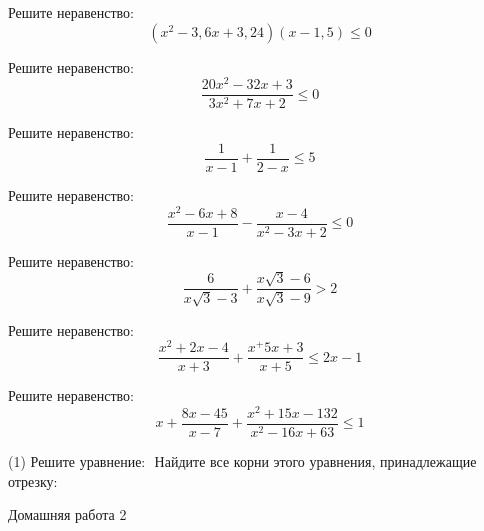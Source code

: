 \begin{class}[number=3]
\begin{listofex}
		
		\item Решите неравенство: %
		\[ (x^2-3,6x+3,24)(x-1,5) \le 0 \]
		
		\item Решите неравенство: %
		\[ \dfrac{20x^2-32x+3}{3x^2+7x+2} \le 0 \]
		
		\item Решите неравенство: %
		\[ \dfrac{1}{x-1}+\dfrac{1}{2-x} \le 5 \]
		
		\item Решите неравенство: %
		\[ \dfrac{x^2-6x+8}{x-1}-\dfrac{x-4}{x^2-3x+2} \le 0 \]
		
		\item Решите неравенство: %
		\[ \dfrac{6}{x\sqrt{3}-3}+\dfrac{x\sqrt{3}-6}{x\sqrt{3}-9} > 2 \]
		
		\item Решите неравенство: %
		\[ \dfrac{x^2 + 2x -4}{x+3}+\dfrac{x^+5x+3}{x+5} \le 2x-1 \]
		
		\item Решите неравенство: %
		\[ x+ \dfrac{8x-45}{x-7}+\dfrac{x^2+15x-132}{x^2-16x+63} \le 1 \]
		
		
	\end{listofex}
\end{class}

\begin{class}[number=4]
	\begin{listofex}
		\item 
		\begin{tasks}(1)
			\task Решите уравнение: \(  \)
			\task Найдите все корни этого уравнения, принадлежащие отрезку: \(  \)
		\end{tasks}
	\end{listofex}
\end{class}

\begin{homework}[number=2]
	\begin{listofex}
		\item Домашняя работа 2
	\end{listofex}
\end{homework}


